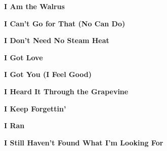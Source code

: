 \newline
\vspace{10pt} 
\begin{center}\textbf{I Am the Walrus}\end{center}
\newline
\vspace{10pt} 
\begin{center}\textbf{I Can't Go for That (No Can Do)}\end{center}
\newline
\vspace{10pt} 
\begin{center}\textbf{I Don't Need No Steam Heat}\end{center}
\newline
\vspace{10pt} 
\begin{center}\textbf{I Got Love}\end{center}
\newline
\vspace{10pt} 
\begin{center}\textbf{I Got You (I Feel Good)}\end{center}
\newline
\vspace{10pt} 
\begin{center}\textbf{I Heard It Through the Grapevine}\end{center}
\newline
\vspace{10pt} 
\begin{center}\textbf{I Keep Forgettin'}\end{center}
\newline
\vspace{10pt} 
\begin{center}\textbf{I Ran}\end{center}
\newline
\vspace{10pt} 
\begin{center}\textbf{I Still Haven't Found What I'm Looking For}\end{center}
